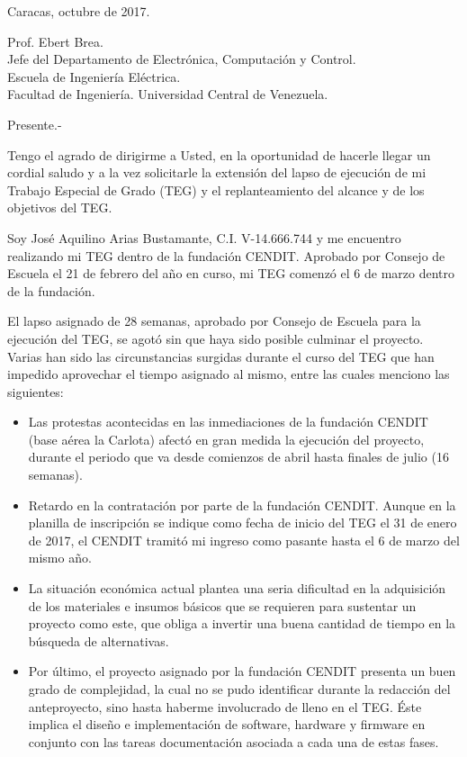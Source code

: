 \documentclass[paper=letter,oneside,fontsize=12pt, parskip=full]{article}
\begin{document}
	\begin{flushright}		
		\large
		Caracas, octubre de 2017. \\	
	\end{flushright}

	
	\begin{onehalfspace}
		\large
		Prof. Ebert Brea. \\
		Jefe del Departamento de Electrónica, Computación y Control. \\
		Escuela de Ingeniería Eléctrica. \\
		Facultad de Ingeniería.
		Universidad Central de Venezuela.	
	\end{onehalfspace}

	Presente.- 
	
	Tengo el agrado de dirigirme a Usted, en la oportunidad de hacerle llegar un cordial saludo y a la vez solicitarle la extensión del lapso de ejecución de mi Trabajo Especial de Grado (TEG) y el replanteamiento del alcance y de los objetivos del TEG.
	 
	Soy José Aquilino Arias Bustamante, C.I. V-14.666.744 y me encuentro realizando mi TEG dentro de la fundación CENDIT. Aprobado por Consejo de Escuela el 21 de febrero del año en curso, mi TEG comenzó el 6 de marzo dentro de la fundación.
	
	El lapso asignado de 28 semanas, aprobado por Consejo de Escuela para la ejecución del TEG, se agotó sin que haya sido posible culminar el proyecto. Varias han sido las circunstancias surgidas durante el curso del TEG que han impedido aprovechar el tiempo asignado al mismo, entre las cuales menciono las siguientes:
	
	\begin{itemize}
		\item Las protestas acontecidas en las inmediaciones de la fundación CENDIT (base aérea la Carlota) afectó en gran medida la ejecución del proyecto, durante el periodo que va desde comienzos de abril hasta finales de julio (16 semanas).
	
		\item Retardo en la contratación por parte de la fundación CENDIT. Aunque en la planilla de inscripción se indique como fecha de inicio del TEG el 31 de enero de 2017, el CENDIT tramitó mi ingreso como pasante hasta el 6 de marzo del mismo año. 
		
		\item La situación económica actual plantea una seria dificultad en la adquisición de los materiales e insumos básicos que se requieren para sustentar un proyecto como este, que obliga a invertir una buena cantidad de tiempo en la búsqueda de alternativas.
	
		\item Por último, el proyecto asignado por la fundación CENDIT presenta un buen grado de complejidad, la cual no se pudo identificar durante la redacción del anteproyecto, sino hasta haberme involucrado de lleno en el TEG. Éste implica el diseño e implementación de software, hardware y firmware en conjunto con las tareas documentación asociada a cada una de estas fases.
	\end{itemize}
	
\end{document}

